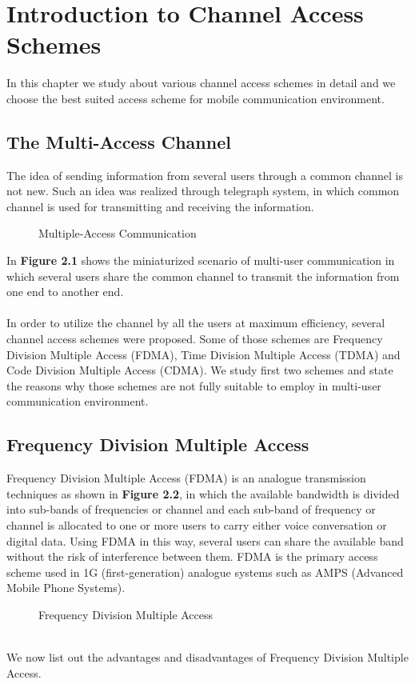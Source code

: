 \chapter{Introduction to Channel Access Schemes}
In this chapter we study about various channel access schemes in detail and we choose the best suited access scheme for mobile communication environment.
\section{The Multi-Access Channel}
The idea of sending information from several users through a common channel is not new. Such an idea was realized through telegraph system, in which common channel is used for transmitting and receiving the information. 
\begin{figure}[htb]
  \centerline{  }
  \caption{Multiple-Access Communication}
\end{figure}
In \textbf{Figure 2.1} shows the miniaturized scenario of multi-user communication in which several users share the common channel to transmit the information from one end to another end. \\ \\
In order to utilize the channel by all the users at maximum efficiency, several channel access schemes were proposed. Some of those schemes are Frequency Division Multiple Access (FDMA), Time Division Multiple Access (TDMA) and Code Division Multiple Access (CDMA). We study first two schemes and state the reasons why those schemes are not fully suitable to employ in multi-user communication environment.
\section{Frequency Division Multiple Access}
Frequency Division Multiple Access (FDMA) is an analogue transmission techniques as shown in \textbf{Figure 2.2}, in which the available bandwidth is divided into sub-bands of frequencies or channel and each sub-band of frequency or channel is allocated to one or more users to carry either voice conversation or digital data. Using FDMA in this way, several users can share the available band without the risk of interference between them. FDMA is the primary access scheme used in 1G (first-generation) analogue systems such as AMPS (Advanced Mobile Phone Systems).
\begin{figure}[htb]
  \centerline{  }
  \caption{Frequency Division Multiple Access}
\end{figure}\\
We now list out the advantages and disadvantages of Frequency Division Multiple Access.

